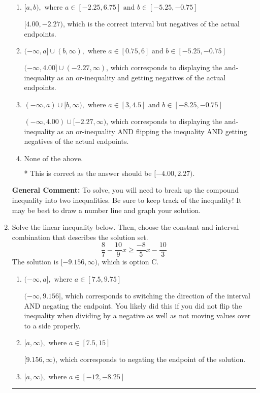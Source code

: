 \documentclass{extbook}[14pt]
\newcommand{\litem}[1]{\item #1

\rule{\textwidth}{0.4pt}}
\begin{document}
\begin{enumerate}
{\begin{enumerate}[label=\Alph*.]
$(4.00, -2.27]$, which corresponds to flipping the inequality and getting negatives of the actual endpoints.
\item \( [a, b), \text{ where } a \in [-2.25, 6.75] \text{ and } b \in [-5.25, -0.75] \)

$[4.00, -2.27)$, which is the correct interval but negatives of the actual endpoints.
\item \( (-\infty, a] \cup (b, \infty), \text{ where } a \in [0.75, 6] \text{ and } b \in [-5.25, -0.75] \)

$(-\infty, 4.00] \cup (-2.27, \infty)$, which corresponds to displaying the and-inequality as an or-inequality and getting negatives of the actual endpoints.
\item \( (-\infty, a) \cup [b, \infty), \text{ where } a \in [3, 4.5] \text{ and } b \in [-8.25, -0.75] \)

$(-\infty, 4.00) \cup [-2.27, \infty)$, which corresponds to displaying the and-inequality as an or-inequality AND flipping the inequality AND getting negatives of the actual endpoints.
\item \( \text{None of the above.} \)

* This is correct as the answer should be $[-4.00, 2.27)$.
\end{enumerate}

\textbf{General Comment:} To solve, you will need to break up the compound inequality into two inequalities. Be sure to keep track of the inequality! It may be best to draw a number line and graph your solution.
}
\litem{
Solve the linear inequality below. Then, choose the constant and interval combination that describes the solution set.
\[ \frac{8}{7} - \frac{10}{9} x \geq \frac{-8}{5} x - \frac{10}{3} \]The solution is \( [-9.156, \infty) \), which is option C.\begin{enumerate}[label=\Alph*.]
\item \( (-\infty, a], \text{ where } a \in [7.5, 9.75] \)

 $(-\infty, 9.156]$, which corresponds to switching the direction of the interval AND negating the endpoint. You likely did this if you did not flip the inequality when dividing by a negative as well as not moving values over to a side properly.
\item \( [a, \infty), \text{ where } a \in [7.5, 15] \)

 $[9.156, \infty)$, which corresponds to negating the endpoint of the solution.
\item \( [a, \infty), \text{ where } a \in [-12, -8.25] \)


\end{enumerate}}
\end{enumerate}
\end{document}
